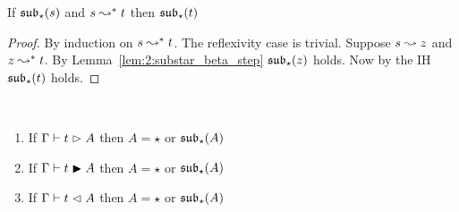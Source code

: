 \begin{lemma}
    If $\mathfrak{sub}_\star(s)$ and $s \leadsto^* t$ then $\mathfrak{sub}_\star(t)$
    \label{lem:2:substar_beta}
\end{lemma}
\begin{proof}
    By induction on $s \leadsto^* t$.
    The reflexivity case is trivial.
    Suppose $s \leadsto z$ and $z \leadsto^* t$.
    By Lemma~\ref{lem:2:substar_beta_step} $\mathfrak{sub}_\star(z)$ holds.
    Now by the IH $\mathfrak{sub}_\star(t)$ holds.
\end{proof}

\begin{lemma}
    \textcolor{white}{\_}
    \begin{enumerate}
        \item If $\Gamma \vdash t \vartriangleright A$ then $A = \star$ or $\mathfrak{sub}_\star(A)$
        \item If $\Gamma \vdash t \blacktriangleright A$ then $A = \star$ or $\mathfrak{sub}_\star(A)$
        \item If $\Gamma \vdash t \vartriangleleft A$ then $A = \star$ or $\mathfrak{sub}_\star(A)$
    \end{enumerate}
    \label{lem:2:star_type_valid}
\end{lemma}
